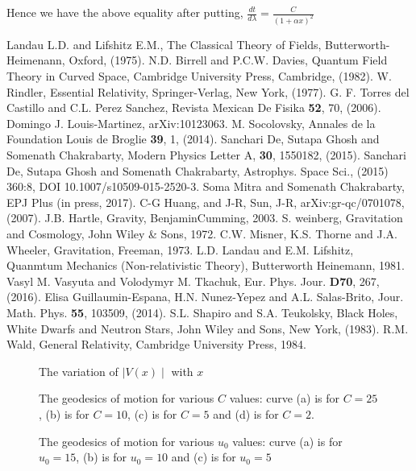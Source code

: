\documentclass[12pt]{article}
\begin{document}
Hence we have the above equality after putting, $\frac{dt}{d\lambda}=\frac{C}{(1+\alpha x)^2}$
\newpage
\begin{thebibliography}{99}
 Landau L.D. and Lifshitz E.M., The Classical Theory of Fields, Butterworth-Heimenann, Oxford, (1975).
 N.D. Birrell and P.C.W. Davies,
Quantum Field Theory in Curved Space, Cambridge University Press,
Cambridge, (1982).
 W. Rindler, Essential Relativity,
Springer-Verlag, New York, (1977).
 G. F. Torres  del Castillo  and C.L. Perez 
Sanchez,  Revista Mexican De Fisika {\bf{52}}, 70, (2006).
 Domingo J. Louis-Martinez, arXiv:10123063.
 M. Socolovsky, Annales de la
Foundation Louis de Broglie {\bf{39}}, 1, (2014).
 Sanchari De, Sutapa Ghosh and Somenath Chakrabarty,
Modern Physics Letter A, {\bf{30}}, 1550182, (2015).
 Sanchari De, Sutapa Ghosh and Somenath Chakrabarty, Astrophys. Space Sci., (2015) 360:8, DOI
10.1007/s10509-015-2520-3.
 Soma Mitra and Somenath Chakrabarty, EPJ Plus (in press, 2017).
 C-G Huang,  and J-R, Sun, J-R, arXiv:gr-qc/0701078, (2007).
 J.B. Hartle, Gravity, BenjaminCumming, 2003.
 S. weinberg, Gravitation and Cosmology, John Wiley \& Sons, 1972.
 C.W. Misner, K.S. Thorne and J.A. Wheeler, Gravitation, Freeman, 1973.
 L.D. Landau and E.M. Lifshitz, Quanmtum Mechanics (Non-relativistic Theory),
Butterworth Heinemann, 1981.
Vasyl M. Vasyuta and Volodymyr M. Tkachuk, Eur. Phys. Jour. {\bf{D70}}, 267, (2016). 
Elisa Guillaumin-Espana, H.N. Nunez-Yepez and A.L. Salas-Brito, Jour. Math. Phys. 
{\bf{55}}, 103509, (2014).
 S.L. Shapiro and S.A. Teukolsky, Black Holes, White Dwarfs
and Neutron Stars, John Wiley and Sons, New York, (1983).
 R.M. Wald, General Relativity, Cambridge University Press, 1984.
\end{thebibliography}
\newpage
\begin{figure}[ht]
\caption{The variation of $\mid V(x)\mid$ with $x$}
\end{figure}
\begin{figure}[ht]
\caption{The geodesics of motion for various $C$ values: curve (a) is for $C=25$, (b) is for 
$C=10$, (c) is for $C=5$ and (d) is for $C=2$.} 
\end{figure}
\begin{figure}[ht]
\caption{The geodesics of motion for various $u_0$ values: curve (a) is for $u_0=15$, (b) is for $u_0=10$ and (c) is
for $u_0=5$}
\end{figure}
\end{document}
